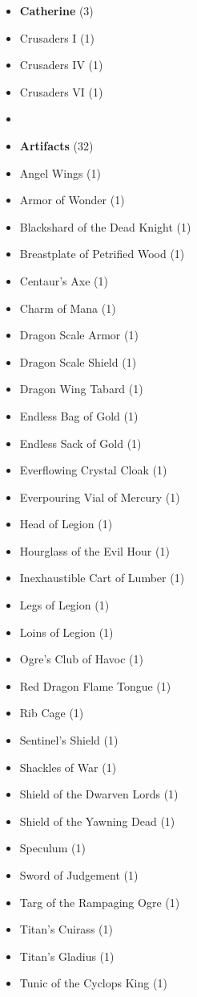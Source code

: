\begin{multicols*}{3}
\begin{itemize}[leftmargin=0pt, label={}, noitemsep]
  \item \textbf{Catherine} (3)
  \item Crusaders I (1)
  \item Crusaders IV (1)
  \item Crusaders VI (1)
  \item
  \item \textbf{Artifacts} (32)
  \item Angel Wings (1)
  \item Armor of Wonder (1)
  \item Blackshard of the Dead Knight (1)
  \item Breastplate of Petrified Wood (1)
  \item Centaur's Axe (1)
  \item Charm of Mana (1)
  \item Dragon Scale Armor (1)
  \item Dragon Scale Shield (1)
  \item Dragon Wing Tabard (1)
  \item Endless Bag of Gold (1)
  \item Endless Sack of Gold (1)
  \item Everflowing Crystal Cloak (1)
  \item Everpouring Vial of Mercury (1)
  \item Head of Legion (1)
  \item Hourglass of the Evil Hour (1)
  \item Inexhaustible Cart of Lumber (1)
  \item Legs of Legion (1)
  \item Loins of Legion (1)
  \item Ogre's Club of Havoc (1)
  \item Red Dragon Flame Tongue (1)
  \item Rib Cage (1)
  \item Sentinel's Shield (1)
  \item Shackles of War (1)
  \item Shield of the Dwarven Lords (1)
  \item Shield of the Yawning Dead (1)
  \item Speculum (1)
  \item Sword of Judgement (1)
  \item Targ of the Rampaging Ogre (1)
  \item Titan's Cuirass (1)
  \item Titan's Gladius (1)
  \item Tunic of the Cyclops King (1)

\end{itemize}
\end{multicols*}

